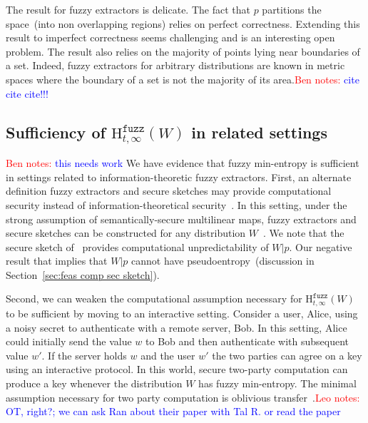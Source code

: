\documentclass[11pt]{article}
\newcommand{\secref}[1]{\mbox{Section~\ref{#1}}}
\newcommand{\Hfuzz}{\mathrm{H}^{\mathtt{fuzz}}_{t,\infty}}
\newcommand{\authnote}[2]{{\textcolor{red}{\textsf{#1 notes: }\textcolor{blue}{ #2}}\marginpar{\textcolor{red}{\textbf{!!!!!}}}}}
\newcommand{\authnote}[2]{}
\newcommand{\bnote}[1]{{\authnote{Ben}{#1}}}
\newcommand{\lnote}[1]{{\authnote{Leo}{#1}}}
\begin{document}
The result for fuzzy extractors is delicate.  The fact that $p$ partitions the space~(into non overlapping regions) relies on perfect correctness.  Extending this result to imperfect correctness seems challenging and is an interesting open problem.
The result also relies on the majority of points lying near boundaries of a set. Indeed, fuzzy extractors for arbitrary distributions are known in metric spaces where the boundary of a set is not the majority of its area.\bnote{cite cite cite!!!}

\subsection{Sufficiency of $\Hfuzz(W)$ in related settings}
\label{sec:related settings}
\bnote{this needs work}
We have evidence that fuzzy min-entropy is sufficient in settings related to information-theoretic fuzzy extractors.  
First, an alternate definition fuzzy extractors and secure sketches may provide computational security instead of information-theoretical security~\cite{fuller2013computational}.  In this setting, under the strong assumption of semantically-secure multilinear maps, fuzzy extractors and secure sketches can be constructed for any distribution $W$~\cite{BitanskyCKP14}.  We note that the secure sketch of~\cite{BitanskyCKP14} provides computational unpredictability of $W |p$.  Our negative result that implies that $W|p$ cannot have pseudoentropy~(discussion in \secref{sec:feas comp sec sketch}).

Second, we can weaken the computational assumption necessary for $\Hfuzz(W)$ to be sufficient by moving to an interactive setting.
Consider a user, Alice, using a noisy secret to authenticate with a remote server, Bob.  In this setting, Alice could initially send the value $w$ to Bob and then authenticate with subsequent value $w'$.  If the server holds $w$ and the user $w'$ the two parties can agree on a key using an interactive protocol.
In this world, secure two-party computation can produce a key whenever the distribution $W$ has fuzzy min-entropy.  The minimal assumption necessary for two party computation is oblivious transfer~\cite{yao1986generate,lindell2009proof}.\lnote{OT, right?; we can ask Ran about their paper with Tal R. or read the paper}
\end{document}
